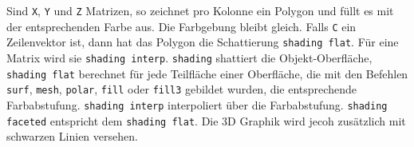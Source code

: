 \newline\newline
Sind \texttt{X}, \texttt{Y} und \texttt{Z} Matrizen, so zeichnet  pro Kolonne ein Polygon und füllt es mit der entsprechenden Farbe aus. Die Farbgebung bleibt gleich. Falls \texttt{C} ein Zeilenvektor ist, dann hat das Polygon die Schattierung \texttt{shading flat}. Für eine Matrix wird sie {\color{red}\texttt{shading interp}}. {\color{red}\texttt{shading}} shattiert die Objekt-Oberfläche, {\color{red}\texttt{shading flat}} berechnet für jede Teilfläche einer Oberfläche, die mit den Befehlen \texttt{surf}, \texttt{mesh}, \texttt{polar}, \texttt{fill} oder \texttt{fill3} gebildet wurden, die entsprechende Farbabstufung. {\color{red}\texttt{shading interp}} interpoliert über die Farbabstufung. {\color{red}\texttt{shading faceted}} entspricht dem {\color{red}\texttt{shading flat}}. Die 3D Graphik wird jecoh zusätzlich mit schwarzen Linien versehen. 
